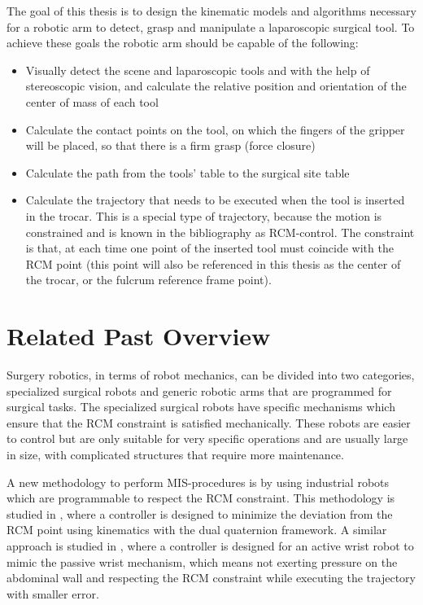 The goal of this thesis is to design the kinematic models and algorithms necessary for a robotic arm to detect, grasp and manipulate a laparoscopic surgical tool. To achieve these goals the robotic arm should be capable of the following:
\begin{itemize}
\item Visually detect the scene and laparoscopic tools and with the help of stereoscopic vision, and calculate the relative position and orientation of the center of mass of each tool
\item Calculate the contact points on the tool, on which the fingers of the gripper will be placed, so that there is a firm grasp (force closure)
\item Calculate the path from the tools' table to the surgical site table
\item Calculate the trajectory that needs to be executed when the tool is inserted in the trocar. This is a special type of trajectory, because the motion is constrained and is known in the bibliography as RCM-control. The constraint is that, at each time one point of the inserted tool must coincide with the RCM point (this point will also be referenced in this thesis as the center of the 
trocar, or the fulcrum reference frame point).
\end{itemize}

%
\section{Related Past Overview}

Surgery robotics, in terms of robot mechanics, can be divided into two categories, specialized surgical robots and generic robotic arms that are programmed for surgical tasks. The specialized surgical robots have specific mechanisms which ensure that the RCM constraint is satisfied mechanically. These robots are easier to control but are only suitable for very specific operations and are usually large in size, with complicated structures that require more maintenance.

A new methodology to perform MIS-procedures is by using industrial robots which are programmable to respect the RCM constraint. This methodology is studied in \cite{Marinho2014APR}, where a controller is designed to minimize the deviation from the RCM point using kinematics with the dual quaternion framework. A similar approach is studied in \cite{Bauzano2009ControlMF}, where a controller is designed for an active wrist robot to mimic the passive wrist mechanism, which means not exerting pressure on the abdominal wall and respecting the RCM constraint while executing the trajectory with smaller error.

